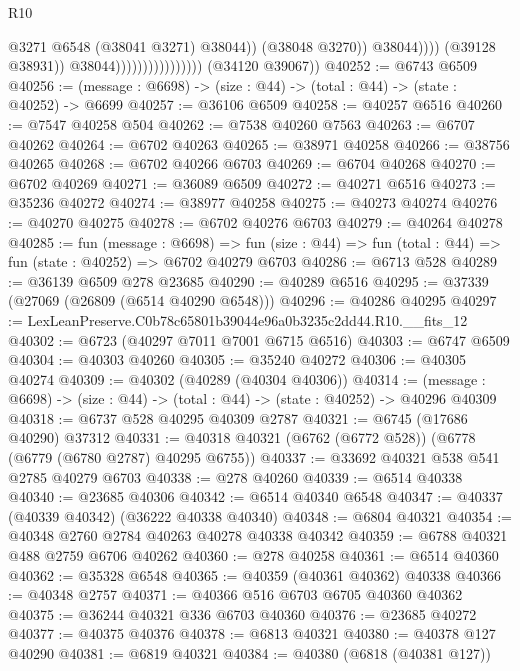 \begin{lexlean}{R10}
\begin{coremodule}
                                                      @3271
                                                      @6548
                                                      (@38041 @3271)
                                                      @38044))
                                                  (@38048 @3270))
                                                @38044))))
                                        (@39128 @38931))
                                      @38044))))))))))))))))
      (@34120 @39067))
@40252 := @6743 @6509
@40256 := (message : @6698) -> (size : @44) -> (total : @44) -> (state : @40252) -> @6699
@40257 := @36106 @6509
@40258 := @40257 @6516
@40260 := @7547 @40258 @504
@40262 := @7538 @40260 @7563
@40263 := @6707 @40262
@40264 := @6702 @40263
@40265 := @38971 @40258
@40266 := @38756 @40265
@40268 := @6702 @40266 @6703
@40269 := @6704 @40268
@40270 := @6702 @40269
@40271 := @36089 @6509
@40272 := @40271 @6516
@40273 := @35236 @40272
@40274 := @38977 @40258
@40275 := @40273 @40274
@40276 := @40270 @40275
@40278 := @6702 @40276 @6703
@40279 := @40264 @40278
@40285 := fun (message : @6698) =>
  fun (size : @44) => fun (total : @44) => fun (state : @40252) => @6702 @40279 @6703
@40286 := @6713 @528
@40289 := @36139 @6509 @278 @23685
@40290 := @40289 @6516
@40295 := @37339 (@27069 (@26809 (@6514 @40290 @6548)))
@40296 := @40286 @40295
@40297 := LexLeanPreserve.C0b78c65801b39044e96a0b3235c2dd44.R10.__fits_12
@40302 := @6723 (@40297 @7011 @7001 @6715 @6516)
@40303 := @6747 @6509
@40304 := @40303 @40260
@40305 := @35240 @40272
@40306 := @40305 @40274
@40309 := @40302 (@40289 (@40304 @40306))
@40314 := (message : @6698) -> (size : @44) -> (total : @44) -> (state : @40252) -> @40296 @40309
@40318 := @6737 @528 @40295 @40309 @2787
@40321 := @6745 (@17686 @40290) @37312
@40331 := @40318 @40321 (@6762 (@6772 @528)) (@6778 (@6779 (@6780 @2787) @40295 @6755))
@40337 := @33692 @40321 @538 @541 @2785 @40279 @6703
@40338 := @278 @40260
@40339 := @6514 @40338
@40340 := @23685 @40306
@40342 := @6514 @40340 @6548
@40347 := @40337 (@40339 @40342) (@36222 @40338 @40340)
@40348 := @6804 @40321
@40354 := @40348 @2760 @2784 @40263 @40278 @40338 @40342
@40359 := @6788 @40321 @488 @2759 @6706 @40262
@40360 := @278 @40258
@40361 := @6514 @40360
@40362 := @35328 @6548
@40365 := @40359 (@40361 @40362) @40338
@40366 := @40348 @2757
@40371 := @40366 @516 @6703 @6705 @40360 @40362
@40375 := @36244 @40321 @336 @6703 @40360
@40376 := @23685 @40272
@40377 := @40375 @40376
@40378 := @6813 @40321
@40380 := @40378 @127 @40290
@40381 := @6819 @40321
@40384 := @40380 (@6818 (@40381 @127))

\end{coremodule}
\end{lexlean}
